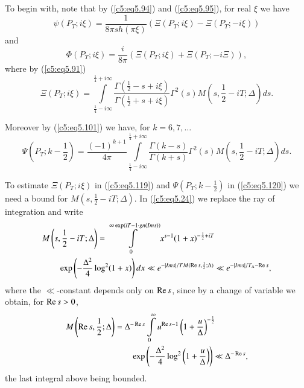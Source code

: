 To begin with, note that by (\ref{c5:eq5.94}) and (\ref{c5:eq5.95}),
for real $\xi$ we have 
\begin{equation}
\psi(P_T;i\xi) = \frac{1}{8\pi sh(\pi \xi)} (\Xi (P_T;i\xi) - \Xi
(P_T;-i\xi)) \label{c5:eq5.117}
\end{equation}
and
\begin{equation}
\Phi (P_T;i\xi) = \frac{i}{8\pi} (\Xi (P_T ; i\xi) + \Xi
(P_T;-i\Xi)),\label{c5:eq5.118} 
\end{equation}\pageoriginale
where by (\ref{c5:eq5.91})
\begin{equation}
\Xi (P_T;i\xi) = \int\limits^{\frac{1}{4} + i \infty}_{\frac{1}{4} - i
  \infty} \frac{\Gamma (\frac{1}{2} - s + i \xi)}{\Gamma (\frac{1}{2}
  + s + i\xi)} \Gamma^2 (s) M \left(s,\frac{1}{2} - iT;\Delta \right)
ds.\label{c5:eq5.119} 
\end{equation}

Moreover by (\ref{c5:eq5.101}) we have, for $k=6,7,\ldots$
{\fontsize{10pt}{12pt}\selectfont
\begin{equation} 
\Psi \left(P_T; k -\frac{1}{2} \right) = \frac{(-1)^{k+1}}{4\pi}
\int\limits^{\frac{1}{4}+i\infty}_{\frac{1}{4} - i \infty}
\frac{\Gamma (k-s)}{\Gamma (k+s)} \Gamma^2 (s) M \left(s, \frac{1}{2}
-iT;\Delta \right)ds.\label{c5:eq5.120} 
\end{equation}}

To estimate $\Xi (P_T;i\xi)$ in (\ref{c5:eq5.119}) and $\Psi (P_T;k
-\frac{1}{2})$ in (\ref{c5:eq5.120}) we need a bound for $M(s,
\frac{1}{2} - iT;\Delta)$. In (\ref{c5:eq5.24}) we replace the ray of
integration and write 
\begin{align}
& M \left(s, \frac{1}{2} -iT;\Delta \right) = \int\limits^{\infty \exp
    (iT-1 \cdot gn (Ims))}_0 x^{s-1} (1+x)^{-\frac{1}{2} + iT}
  \label{c5:eq5.121}\\  
& \qquad \exp \left(-\frac{\Delta^2}{4} \log^2 (1+x) \right) dx
\ll e^{-|Im s| / T M (\operatorname{Re} s, \frac{1}{2};\Delta)} \ll e^{-|Im s|
  /T_\Delta - \operatorname{Re} s},\notag 
\end{align}
where the $\ll$-constant depends only on $\operatorname{Re} s$, since by a change of
variable we obtain, for $\operatorname{Re} s>0$, 
\begin{align*}
 M \left(\operatorname{Re} s, \frac{1}{2};\Delta \right) & = \Delta^{-\operatorname{Re} s}
 \int\limits^\infty_0 u^{\operatorname{Re} s -1} \left(1+\frac{u}{\Delta}
 \right)^{-\frac{1}{2}} \\ 
& \qquad \exp \left(-\frac{\Delta^2}{4} \log^2
 \left(1+\frac{u}{\Delta} \right) \right) \ll \Delta^{-\operatorname{Re} s},  
\end{align*}
the last integral above being bounded.

